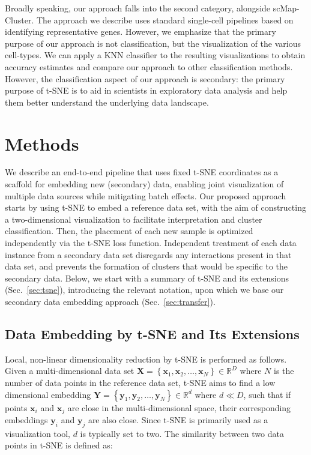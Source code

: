 \documentclass[runningheads]{llncs}
\begin{document}
Broadly speaking, our approach falls into the second category, alongside
scMap-Cluster. The approach we describe uses standard single-cell pipelines
based on identifying representative genes. However, we emphasize that the
primary purpose of our approach is not classification, but the visualization of
the various cell-types. We can apply a KNN classifier to the resulting
visualizations to obtain accuracy estimates and compare our approach to other
classification methods. However, the classification aspect of our approach is
secondary: the primary purpose of t-SNE is to aid in scientists in exploratory
data analysis and help them better understand the underlying data landscape.


\section{Methods}

We describe an end-to-end pipeline that uses fixed t-SNE coordinates as a
scaffold for embedding new (secondary) data, enabling joint visualization of
multiple data sources while mitigating batch effects. Our proposed approach
starts by using t\nobreakdash -SNE to embed a reference data set, with the aim
of constructing a two-dimensional visualization to facilitate interpretation
and cluster classification. Then, the placement of each new sample is optimized
independently via the t\nobreakdash -SNE loss function. Independent treatment
of each data instance from a secondary data set disregards any interactions
present in that data set, and prevents the formation of clusters that would be
specific to the secondary data. Below, we start with a summary of t-SNE and its
extensions (Sec.~\ref{sec:tsne}), introducing the relevant notation, upon which
we base our secondary data embedding approach (Sec.~\ref{sec:transfer}).


\subsection{Data Embedding by t-SNE and Its Extensions\label{sec:tsne}}

Local, non-linear dimensionality reduction by t-SNE is performed as follows.
Given a multi-dimensional data set $\mathbf{X} = \left \{ \mathbf{x}_1,
\mathbf{x}_2, \dots, \mathbf{x}_N \right \} \in \mathbb{R}^D$ where $N$ is the
number of data points in the reference data set, t-SNE aims to find a low
dimensional embedding $\mathbf{Y} = \left \{ \mathbf{y}_1, \mathbf{y}_2, \dots,
\mathbf{y}_N \right \} \in \mathbb{R}^d$ where $d \ll D$, such that if points
$\mathbf{x}_i$ and $\mathbf{x}_j$ are close in the multi-dimensional space,
their corresponding embeddings $\mathbf{y}_i$ and $\mathbf{y}_j$ are also
close. Since t-SNE is primarily used as a visualization tool, $d$ is typically
set to two. The similarity between two data points in t-SNE is defined as:
\end{document}
